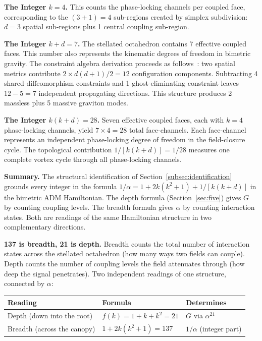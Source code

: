 \documentclass[aps,prd,preprint,superscriptaddress,showpacs,preprintnumbers,amsmath,amssymb,nofootinbib]{revtex4-2}
\begin{document}
\textbf{The Integer $k = 4$.}
This counts the phase-locking channels per coupled face, corresponding to the $(3+1) = 4$ sub-regions created by simplex subdivision: $d = 3$ spatial sub-regions plus 1 central coupling sub-region.

\textbf{The Integer $k + d = 7$.}
The stellated octahedron contains 7 effective coupled faces. This number also represents the kinematic degrees of freedom in bimetric gravity. The constraint algebra derivation proceeds as follows~\cite{hassan2012}: two spatial metrics contribute $2 \times d(d+1)/2 = 12$ configuration components. Subtracting 4 shared diffeomorphism constraints and 1 ghost-eliminating constraint leaves $12 - 5 = 7$ independent propagating directions. This structure produces 2 massless plus 5 massive graviton modes.

\textbf{The Integer $k(k+d) = 28$.}
Seven effective coupled faces, each with $k = 4$ phase-locking channels, yield $7 \times 4 = 28$ total face-channels. Each face-channel represents an independent phase-locking degree of freedom in the field-closure cycle. The topological contribution $1/[k(k+d)] = 1/28$ measures one complete vortex cycle through all phase-locking channels.

\textbf{Summary.}
The structural identification of Section~\ref{subsec:identification} grounds every integer in the formula $1/\alpha = 1 + 2k(k^2 + 1) + 1/[k(k{+}d)]$ in the bimetric ADM Hamiltonian. The depth formula (Section~\ref{sec:five}) gives $G$ by counting coupling levels. The breadth formula gives $\alpha$ by counting interaction states. Both are readings of the same Hamiltonian structure in two complementary directions.

\textbf{137 is breadth, 21 is depth.} Breadth counts the total number of interaction states across the stellated octahedron (how many ways two fields can couple). Depth counts the number of coupling levels the field attenuates through (how deep the signal penetrates). Two independent readings of one structure, connected by $\alpha$:

\begin{center}
\renewcommand{\arraystretch}{1.4}
\begin{tabular*}{0.9\textwidth}{@{\extracolsep{\fill}} lll @{}}
\toprule
\textbf{Reading} & \textbf{Formula} & \textbf{Determines} \\
\midrule
Depth (down into the root) & $f(k) = 1 + k + k^2 = 21$ & $G$ via $\alpha^{21}$ \\
Breadth (across the canopy) & $1 + 2k(k^2 + 1) = 137$ & $1/\alpha$ (integer part) \\
\bottomrule
\end{tabular*}
\end{center}
\end{document}
